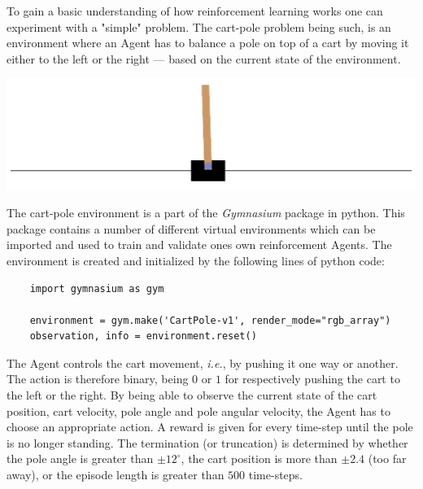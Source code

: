 \documentclass{article}
\begin{document}
\begin{minipage}{.5\textwidth}
  To gain a basic understanding of how reinforcement learning works one can experiment with a "simple" problem. The cart-pole problem being such, is an environment where an Agent has to balance a pole on top of a cart by moving it either to the left or the right — based on the current state of the environment.
\end{minipage}%
\begin{minipage}{.5\textwidth}
  \centering
  \includegraphics[width=.8\linewidth]{images/cart-pole.png}
\end{minipage}

\vspace{0.2cm}

The cart-pole environment is a part of the \textit{Gymnasium} package in python. This package contains a number of different virtual environments which can be imported and used to train and validate ones own reinforcement Agents. \cite{Gymnasium} \cite{Cart-pole} The environment is created and initialized by the following lines of python code:

\vspace{0.2cm}

\begin{lstlisting}
    import gymnasium as gym
    
    environment = gym.make('CartPole-v1', render_mode="rgb_array")
    observation, info = environment.reset()
\end{lstlisting}

The Agent controls the cart movement, \textit{i.e.}, by pushing it one way or another. The action is therefore binary, being $0$ or $1$ for respectively pushing the cart to the left or the right. By being able to observe the current state of the cart position, cart velocity, pole angle and pole angular velocity, the Agent has to choose an appropriate action. A reward is given for every time-step until the pole is no longer standing. The termination (or truncation) is determined by whether the pole angle is greater than $\pm 12 ^\circ$, the cart position is more than $\pm 2.4$ (too far away), or the episode length is greater than $500$ time-steps.
\end{document}
